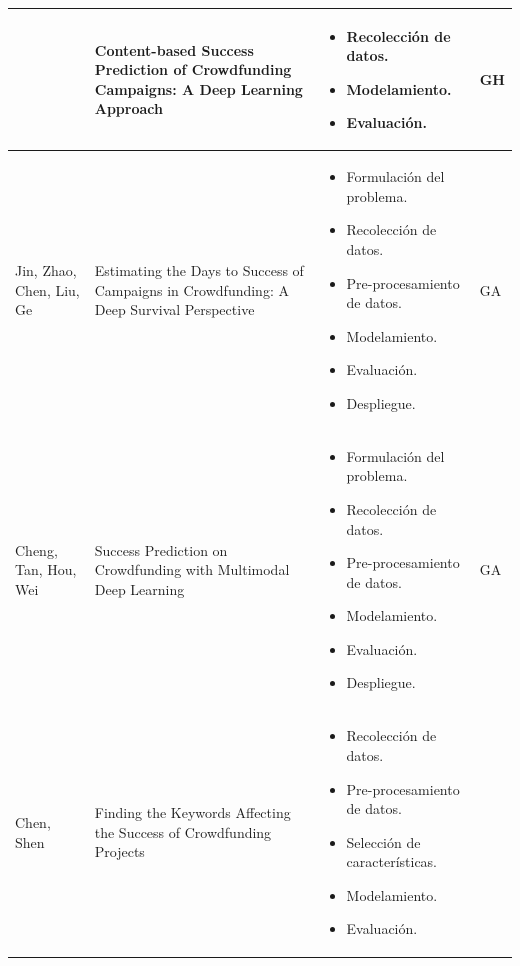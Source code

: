 \begin{longtable}{|M{3cm}|M{5.5cm}|M{5.5cm}|M{1.5cm}|}
			& Content-based Success Prediction of Crowdfunding Campaigns: A Deep Learning Approach
			& 
			\begin{itemize}[noitemsep,leftmargin=*]
				\item Recolección de datos.
				\item Modelamiento.
				\item Evaluación.
			\end{itemize}
			& GH
			\\
			\hline
			Jin, Zhao, Chen, Liu, Ge
			& Estimating the Days to Success of Campaigns in Crowdfunding: A Deep Survival Perspective
			& 
			\begin{itemize}[noitemsep,leftmargin=*]
				\item Formulación del problema.
				\item Recolección de datos.
				\item Pre-procesamiento de datos.
				\item Modelamiento.
				\item Evaluación.
				\item Despliegue.
			\end{itemize}
			& GA
			\\
			\hline
			Cheng, Tan, Hou, Wei
			& Success Prediction on Crowdfunding with Multimodal Deep Learning
			& 
			\begin{itemize}[noitemsep,leftmargin=*]
				\item Formulación del problema.
				\item Recolección de datos.
				\item Pre-procesamiento de datos.
				\item Modelamiento.
				\item Evaluación.
				\item Despliegue.
			\end{itemize}
			& GA
			\\
			\hline
			Chen, Shen
			& Finding the Keywords Affecting the Success of Crowdfunding Projects
			& 
			\begin{itemize}[noitemsep,leftmargin=*]
				\item Recolección de datos.
				\item Pre-procesamiento de datos.
				\item Selección de características.
				\item Modelamiento.
				\item Evaluación.
			\end{itemize}

\end{longtable}
